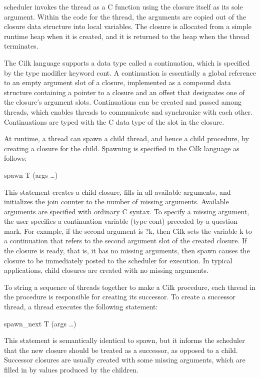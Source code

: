\documentclass[
]{article}
\begin{document}
scheduler invokes the thread as a C function using the closure itself as
its sole argument. Within the code for the thread, the arguments are
copied out of the closure data structure into local variables. The
closure is allocated from a simple runtime heap when it is created, and
it is returned to the heap when the thread terminates.

The Cilk language supports a data type called a continuation, which is
specified by the type modifier keyword cont. A continuation is
essentially a global reference to an empty argument slot of a closure,
implemented as a compound data structure containing a pointer to a
closure and an offset that designates one of the closure's argument
slots. Continuations can be created and passed among threads, which
enables threads to communicate and synchronize with each other.
Continuations are typed with the C data type of the slot in the closure.

At runtime, a thread can spawn a child thread, and hence a child
procedure, by creating a closure for the child. Spawning is specified in
the Cilk language as follows:

spawn T (args \ldots)

This statement creates a child closure, fills in all available
arguments, and initializes the join counter to the number of missing
arguments. Available arguments are specified with ordinary C syntax. To
specify a missing argument, the user specifies a continuation variable
(type cont) preceded by a question mark. For example, if the second
argument is ?k, then Cilk sets the variable k to a continuation that
refers to the second argument slot of the created closure. If the
closure is ready, that is, it has no missing arguments, then spawn
causes the closure to be immediately posted to the scheduler for
execution. In typical applications, child closures are created with no
missing arguments.

To string a sequence of threads together to make a Cilk procedure, each
thread in the procedure is responsible for creating its successor. To
create a successor thread, a thread executes the following statement:

spawn\_next T (args \ldots)

This statement is semantically identical to spawn, but it informs the
scheduler that the new closure should be treated as a successor, as
opposed to a child. Successor closures are usually created with some
missing arguments, which are filled in by values produced by the
children.
\end{document}
